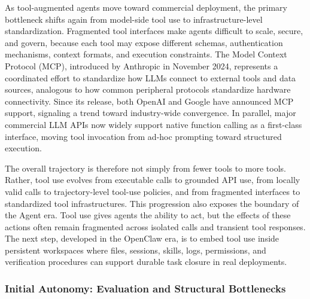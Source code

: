 As tool-augmented agents move toward commercial deployment, the primary bottleneck shifts again from model-side tool use to infrastructure-level standardization. Fragmented tool interfaces make agents difficult to scale, secure, and govern, because each tool may expose different schemas, authentication mechanisms, context formats, and execution constraints. The Model Context Protocol (MCP)\cite{mcp2026tools}, introduced by Anthropic in November 2024, represents a coordinated effort to standardize how LLMs connect to external tools and data sources, analogous to how common peripheral protocols standardize hardware connectivity. Since its release, both OpenAI and Google have announced MCP support, signaling a trend toward industry-wide convergence. In parallel, major commercial LLM APIs now widely support native function calling as a first-class interface, moving tool invocation from ad-hoc prompting toward structured execution\citep{hu2023language,babu2025adaptive,li2025task,wang2023describe,huang2025recommender}.

The overall trajectory is therefore not simply from fewer tools to more tools. Rather, tool use evolves from executable calls to grounded API use, from locally valid calls to trajectory-level tool-use policies, and from fragmented interfaces to standardized tool infrastructures. This progression also exposes the boundary of the Agent era. Tool use gives agents the ability to act, but the effects of these actions often remain fragmented across isolated calls and transient tool responses. The next step, developed in the OpenClaw era, is to embed tool use inside persistent workspaces where files, sessions, skills, logs, permissions, and verification procedures can support durable task closure in real deployments.





\subsubsection{Initial Autonomy: Evaluation and Structural Bottlenecks}

